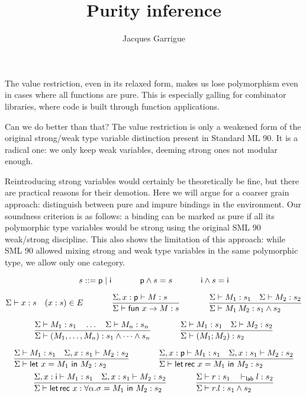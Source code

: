 \documentclass[a4paper]{article}
\title{Purity inference}
\author{Jacques Garrigue}
\let\th\vdash
\let\E\Sigma
\let\ra\rightarrow
\let\tv\alpha
\def\p{\mathsf{p}}
\def\i{\mathsf{i}}
\newcommand\lfrac[2]{\frac{#1\hfill}{#2\hfill}}
\newcommand\mlet[1]{\textsf{let}~#1~\textsf{in}~}
\newcommand\mletrec[1]{\textsf{let\,rec}~#1~\textsf{in}~}
\newcommand\mfun[1]{\textsf{fun}~#1 \ra}
\begin{document}
\maketitle

The value restriction, even in its relaxed form, makes us lose
polymorphism even in cases where all functions are pure.
This is especially galling for combinator libraries, where code is
built through function applications.

Can we do better than that?
The value restriction is only a weakened form of the original
strong/weak type variable distinction present in Standard ML 90.
It is a radical one: we only keep weak variables, deeming strong ones
not modular enough.

Reintroducing strong variables would certainly be theoretically be
fine, but there are practical reasons for their demotion.
Here we will argue for a coarser grain approach: distinguish between
pure and impure bindings in the environment.
Our soundness criterion is as follows: a binding can be marked as pure
if all its polymorphic type variables would be strong using the
original SML 90 weak/strong discipline.
This also shows the limitation of this approach: while SML 90 allowed
mixing strong and weak type variables in the same polymorphic type, we
allow only one category.

\[ s ::= \p \mid \i
\hspace{8ex}
\p \land s = s
\hspace{8ex}
\i \land s = \i
\]

\[
\E \th x : s  \quad (x:s)\in E
\hspace{8ex}
\lfrac{\E, x : \p \th M : s}
     {\E \th \mfun x M : s}
\hspace{8ex}
\lfrac{\E \th M_1 : s_1 \quad \E \th M_2 : s_2}
{\E \th M_1 \, M_2 : s_1 \land s_2}
\]

\[
\lfrac{\E \th M_1 : s_1 \quad \dots \quad \E \th M_n : s_n}
{\E \th (M_1, \dots, M_n) : s_1 \land \dots \land s_n}
\hspace{8ex}
\lfrac{\E \th M_1 : s_1 \quad \E \th M_2 : s_2}
{\E \th (M_1 ; M_2) : s_2}
\]

\[
\lfrac{\E \th M_1 : s_1 \quad \E, x : s_1 \th M_2 : s_2}
{\E \th \mlet{x=M_1} M_2 : s_2}
\hspace{8ex}
\lfrac{\E, x : \p \th M_1 : s_1 \quad \E, x : s_1 \th M_2 : s_2}
{\E \th \mletrec{x=M_1} M_2 : s_2}
\]
\[
\lfrac{\E, x : \i \th M_1 : s_1 \quad \E, x : s_1 \th M_2 : s_2}
{\E \th \mletrec{x:\forall\tv.\sigma=M_1} M_2 : s_2}
\hspace{8ex}
\lfrac{\E \th r : s_1 \quad \th_{\sf lab} l : s_2}
{\E \th r.l : s_1 \land s_2}
\]
\end{document}

